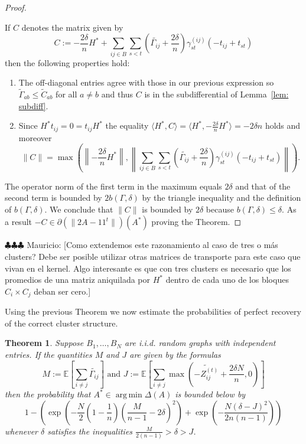\documentclass[12pt]{amsart}
\newtheorem{theorem}[lemma]{Theorem}
\theoremstyle{remark}
\DeclareMathOperator*{\argmin}{arg\,min}
\newcommand{\EE}{\mathbb{E}}
\newcommand{\mv}[1]{{\color{red} \sf $\clubsuit\clubsuit\clubsuit$ Mauricio: [#1]}}
\begin{document}
\begin{proof}
\begin{enumerate}
\end{enumerate}
If $C$ denotes the matrix given by
\[C:= -\frac{2\delta}{n}H^* + \sum_{ij\in B} \sum_{s<t} \left(\widetilde{\Gamma_{ij}}+\frac{2\delta}{n}\right)\gamma_{st}^{(ij)} (-t_{ij}+t_{st})\]
then the following properties hold:
\begin{enumerate}
\item The off-diagonal entries agree with those in our previous expression so $\widetilde{\Gamma}_{ab}\leq \widetilde{C}_{ab}$ for all $a\neq b$ and thus $C$ is in the subdifferential of Lemma~\ref{lem: subdiff}.
\item Since $H^*t_{ij}=0=t_{ij}H^*$ the equality $\langle H^*, C\rangle =\langle H^*,-\frac{2\delta}{n}H^*\rangle = -2\delta n$ holds and moreover
\[ \| C\|=\max\left(\left\|-\frac{2\delta}{n}H^*\right\|, \left\|\sum_{ij\in B} \sum_{s<t} \left(\widetilde{\Gamma_{ij}}+\frac{2\delta}{n}\right)\gamma_{st}^{(ij)} (-t_{ij}+t_{st})\right\|\right).\] 
\end{enumerate}
The operator norm of the first term in the maximum equals $2\delta$ and that of the second term is bounded by $2b(\Gamma,\delta)$ by the triangle inequality and the definition of $b(\Gamma,\delta)$. We conclude that $\|C\|$ is bounded by $2\delta$ because $b(\Gamma,\delta)\leq \delta$. As a result $-C\in \partial\left(\|2A-11^t\|\right)(A^*)$ proving the Theorem.
\end{proof}

\mv{Como extendemos este razonamiento al caso de tres o m\'as clusters? Debe ser posible utilizar otras matrices de transporte para este caso que vivan en el kernel. Algo interesante es que con tres clusters es necesario que los promedios de una matriz aniquilada por $H^*$ dentro de cada uno de los bloques $C_i\times C_j$ deban ser cero.} 

Using the previous Theorem we now estimate the probabilities of perfect recovery of the correct cluster structure. 

\begin{theorem} Suppose $B_1,\dots, B_N$ are i.i.d. random graphs with independent entries. If the quantities $M$ and $J$ are given by the formulas 
\[ M:=\EE\left[\sum_{i\neq j}\widetilde{\Gamma_{ij}}\right]\text{ and }J:=\EE\left[\sum_{i\neq j}\max\left(\widetilde{-Z_{ij}^{(t)}}+\frac{2\delta N}{n},0\right)\right]\]
then the probability that $A^*\in \argmin \Delta(A)$ is bounded below by
\[1-\left(\exp\left( -\frac{N}{2}\left(1-\frac{1}{n}\right) \left(\frac{M}{n-1}-2\delta\right)^2\right)+\exp\left(-\frac{N(\delta-J)^2}{2n(n-1)}\right)\right)\]
whenever $\delta$ satisfies the inequalities $\frac{M}{2(n-1)}>\delta>J$. 
\end{theorem}
\end{document}
